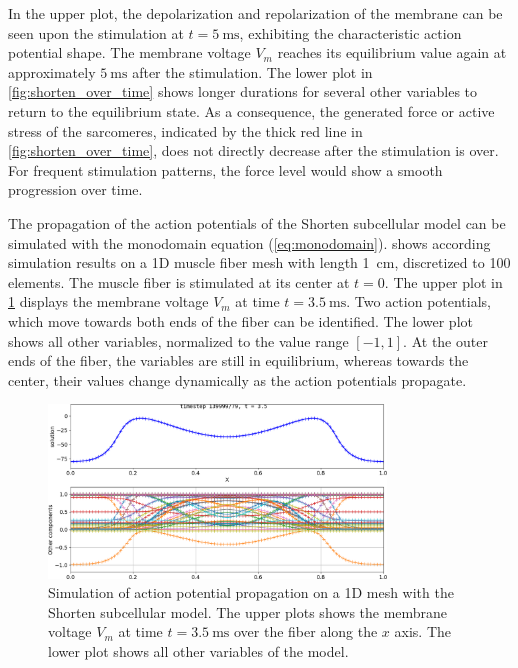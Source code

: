 In the upper plot, the depolarization and repolarization of the membrane can be seen upon the stimulation at $t=\SI{5}{\ms}$, exhibiting the characteristic action potential shape. The membrane voltage $V_m$ reaches its equilibrium value again at approximately $\SI{5}{\ms}$ after the stimulation. 
The lower plot in \cref{fig:shorten_over_time} shows longer durations for several other variables to return to the equilibrium state. As a consequence, the generated force or active stress of the sarcomeres, indicated by the thick red line in \cref{fig:shorten_over_time}, does not directly decrease after the stimulation is over. For frequent stimulation patterns, the force level would show a smooth progression over time.

The propagation of the action potentials of the Shorten subcellular model can be simulated with the monodomain equation (\cref{eq:monodomain}).  shows according simulation results on a 1D muscle fiber mesh with length \SI{1}{\cm}, discretized to 100 elements. The muscle fiber is stimulated at its center at $t=0$. The upper plot in \cref{fig:shorten_03_50} displays the membrane voltage $V_m$ at time $t=\SI{3.5}{\ms}$. Two action potentials, which move towards both ends of the fiber can be identified. The lower plot shows all other variables, normalized to the value range $[-1,1]$. At the outer ends of the fiber, the variables are still in equilibrium, whereas towards the center, their values change dynamically as the action potentials propagate. 

\begin{figure}
  \centering%
  \includegraphics[width=0.8\textwidth]{images/results/basic/shorten_03_50.png}%
  \caption{Simulation of action potential propagation on a 1D mesh with the Shorten subcellular model. The upper plots shows the membrane voltage $V_m$ at time $t=\SI{3.5}{\ms}$ over the fiber along the $x$ axis. The lower plot shows all other variables of the model.}%
  \label{fig:shorten_03_50}%
\end{figure}%

